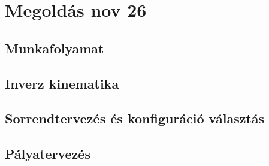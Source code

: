 \chapter{Megoldás nov 26}
\section{Munkafolyamat}
\section{Inverz kinematika}
\section{Sorrendtervezés és konfiguráció választás}
\section{Pályatervezés}
